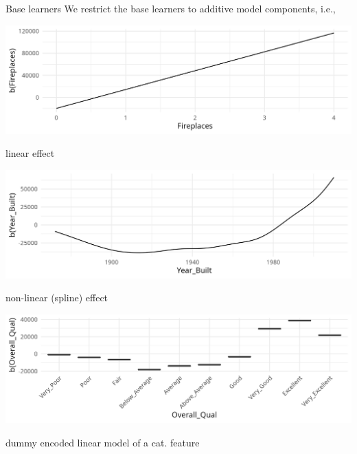 \documentclass[11pt,compress,t,notes=noshow, xcolor=table]{beamer}
\begin{document}
\begin{vbframe}{Base learners}
We restrict the base learners to additive model components, i.e.,
\begin{minipage}{0.4\textwidth}
    \includegraphics[width=\linewidth]{figure/compboost-base-learner-linear.png}
\end{minipage}\hfill
\begin{minipage}{0.5\textwidth}
  linear effect
\end{minipage}

\begin{minipage}{0.4\textwidth}
    \includegraphics[width=\linewidth]{figure/compboost-base-learner-spline.png}
\end{minipage}\hfill
\begin{minipage}{0.5\textwidth}
  non-linear (spline) effect
\end{minipage}

\begin{minipage}{0.4\textwidth}
    \includegraphics[width=\linewidth]{figure/compboost-base-learner-ridge.png}
\end{minipage}\hfill
\begin{minipage}{0.5\textwidth}
  dummy encoded linear model of a cat. feature
\end{minipage}


\end{vbframe}
\end{document}
